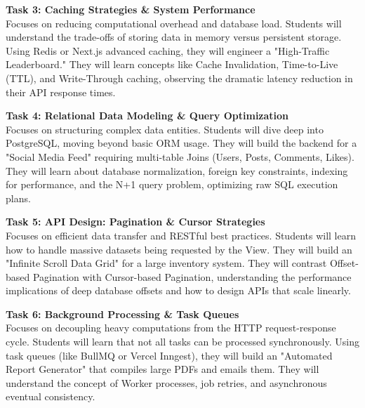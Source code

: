 \vspace{0.3cm}

\noindent\textbf{Task 3: Caching Strategies \& System Performance} \\
Focuses on reducing computational overhead and database load. Students will understand the trade-offs of storing data in memory versus persistent storage. Using Redis or Next.js advanced caching, they will engineer a "High-Traffic Leaderboard." They will learn concepts like Cache Invalidation, Time-to-Live (TTL), and Write-Through caching, observing the dramatic latency reduction in their API response times.

\vspace{0.3cm}

\noindent\textbf{Task 4: Relational Data Modeling \& Query Optimization} \\
Focuses on structuring complex data entities. Students will dive deep into PostgreSQL, moving beyond basic ORM usage. They will build the backend for a "Social Media Feed" requiring multi-table Joins (Users, Posts, Comments, Likes). They will learn about database normalization, foreign key constraints, indexing for performance, and the N+1 query problem, optimizing raw SQL execution plans.

\vspace{0.3cm}

\noindent\textbf{Task 5: API Design: Pagination \& Cursor Strategies} \\
Focuses on efficient data transfer and RESTful best practices. Students will learn how to handle massive datasets being requested by the View. They will build an "Infinite Scroll Data Grid" for a large inventory system. They will contrast Offset-based Pagination with Cursor-based Pagination, understanding the performance implications of deep database offsets and how to design APIs that scale linearly.

\vspace{0.3cm}

\noindent\textbf{Task 6: Background Processing \& Task Queues} \\
Focuses on decoupling heavy computations from the HTTP request-response cycle. Students will learn that not all tasks can be processed synchronously. Using task queues (like BullMQ or Vercel Inngest), they will build an "Automated Report Generator" that compiles large PDFs and emails them. They will understand the concept of Worker processes, job retries, and asynchronous eventual consistency.

